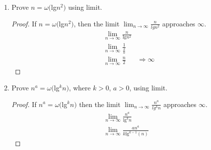 \documentclass{article}
\begin{document}
\begin{enumerate}
\begin{proof}
\begin{align*}
                        n &\leq c
                    \end{align*}
                    As $n$ approaches infinity it cannot be bounded by a constant. Thus $n^3\not\in O(n^2)$.
                \end{proof}
            \item Prove $n=\omega($lg$n^2)$ using limit.
                \begin{proof}
                    If $n=\omega($lg$n^2)$, then the limit $\lim_{n\to\infty}\frac{n}{lgn^2}$ approaches $\infty$.
                    \begin{align*}
                        \lim_{n\to\infty}\frac{n}{\text{lg}n^2}&\\
                        \lim_{n\to\infty}\frac{1}{\frac{2}{n}}&\\
                        \lim_{n\to\infty}\frac{n}{2}& \Rightarrow \infty
                    \end{align*}
                \end{proof}
            \item Prove $n^a=\omega($lg$^kn)$, where $k>0$, $a>0$, using limit.
                \begin{proof}
                    If $n^a=\omega($lg$^kn)$ then the limit $\lim_{n\to\infty}\frac{n^a}{lg^kn}$ approaches $\infty$.
                    \begin{align*}
                        \lim_{n\to\infty}\frac{n^a}{\text{lg}^kn}&\\
                        \lim_{n\to\infty}\frac{an^{a}}{k\text{lg}^{k-1}(n)}&
                    \end{align*}
                \end{proof}
        \end{enumerate}
    
\end{document}
